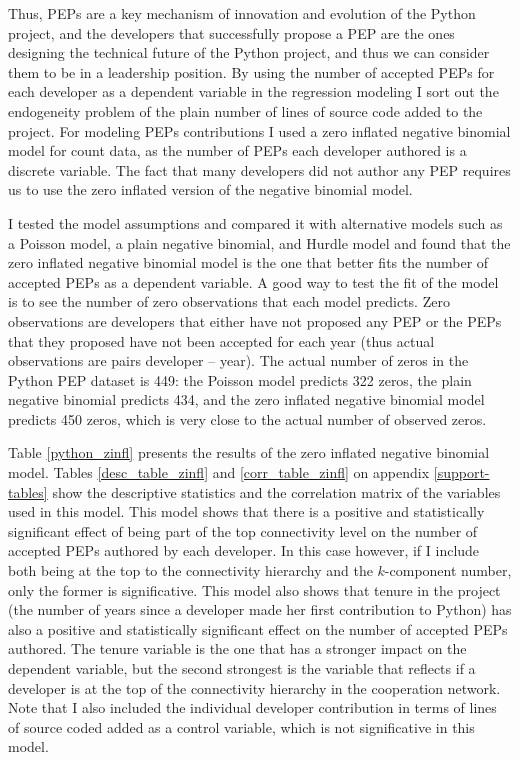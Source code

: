 Thus, PEPs are a key mechanism of innovation and evolution of the Python project, and the developers that successfully propose a PEP are the ones designing the technical future of the Python project, and thus we can consider them to be in a leadership position. By using the number of accepted PEPs for each developer as a dependent variable in the regression modeling I sort out the endogeneity problem of the plain number of lines of source code added to the project. For modeling PEPs contributions I used a zero inflated negative binomial model for count data, as the number of PEPs each developer authored is a discrete variable. The fact that many developers did not author any PEP requires us to use the zero inflated version of the negative binomial model.

I tested the model assumptions and compared it with alternative models such as a Poisson model, a plain negative binomial, and Hurdle model and found that the zero inflated negative binomial model is the one that better fits the number of accepted PEPs as a dependent variable. A good way to test the fit of the model is to see the number of zero observations that each model predicts. Zero observations are developers that either have not proposed any PEP or the PEPs that they proposed have not been accepted for each year (thus actual observations are pairs developer -- year). The actual number of zeros in the Python PEP dataset is 449: the Poisson model predicts 322 zeros, the plain negative binomial predicts 434, and the zero inflated negative binomial model predicts 450 zeros, which is very close to the actual number of observed zeros.

Table \ref{python_zinfl} presents the results of the zero inflated negative binomial model. Tables \ref{desc_table_zinfl} and \ref{corr_table_zinfl} on appendix \ref{support-tables} show the descriptive statistics and the correlation matrix of the variables used in this model. This model shows that there is a positive and statistically significant effect of being part of the top connectivity level on the number of accepted PEPs authored by each developer. In this case however, if I include both being at the top to the connectivity hierarchy and the $k$-component number, only the former is significative. This model also shows that tenure in the project (the number of years since a developer made her first contribution to Python) has also a positive and statistically significant effect on the number of accepted PEPs authored. The tenure variable is the one that has a stronger impact on the dependent variable, but the second strongest is the variable that reflects if a developer is at the top of the connectivity hierarchy in the cooperation network. Note that I also included the individual developer contribution in terms of lines of source coded added as a control variable, which is not significative in this model. 

